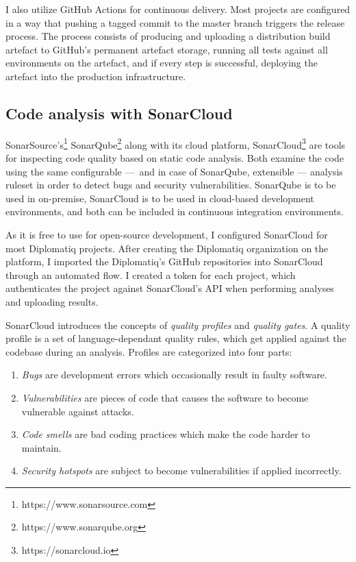 I also utilize GitHub Actions for continuous delivery. Most projects are configured in a way that pushing a tagged commit to the master branch triggers the release process. The process consists of producing and uploading a distribution build artefact to GitHub's permanent artefact storage, running all tests against all environments on the artefact, and if every step is successful, deploying the artefact into the production infrastructure.

\subsection{Code analysis with SonarCloud}

SonarSource's\footnote{https://www.sonarsource.com} SonarQube\footnote{https://www.sonarqube.org} along with its cloud platform, SonarCloud\footnote{https://sonarcloud.io} are tools for inspecting code quality based on static code analysis. Both examine the code using the same configurable — and in case of SonarQube, extensible — analysis ruleset in order to detect bugs and security vulnerabilities. SonarQube is to be used in on-premise, SonarCloud is to be used in cloud-based development environments, and both can be included in continuous integration environments.

As it is free to use for open-source development, I configured SonarCloud for most Diplomatiq projects. After creating the Diplomatiq organization on the platform, I imported the Diplomatiq's GitHub repositories into SonarCloud through an automated flow. I created a token for each project, which authenticates the project against SonarCloud's API when performing analyses and uploading results.

SonarCloud introduces the concepts of \emph{quality profiles} and \emph{quality gates}. A quality profile is a set of language-dependant quality rules, which get applied against the codebase during an analysis. Profiles are categorized into four parts:

\begin{enumerate}
\item \emph{Bugs} are development errors which occasionally result in faulty software.
\item \emph{Vulnerabilities} are pieces of code that causes the software to become vulnerable against attacks.
\item \emph{Code smells} are bad coding practices which make the code harder to maintain.
\item \emph{Security hotspots} are subject to become vulnerabilities if applied incorrectly.
\end{enumerate}

